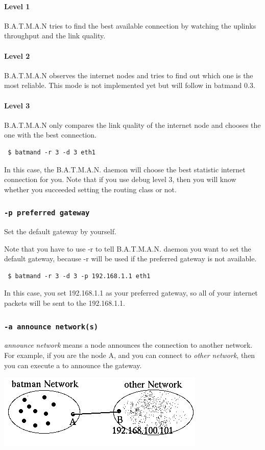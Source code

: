 \documentclass[
	12pt,
	a4paper,
	twoside,
	english,
	headsepline,
	footnosepline,
	automark,
	normalheadings,
	openany,
	cleardoubleplain,
	abstracton,
	idxtotoc,
	liststotoc,
	bibtotoc,
 	BCOR8mm,
]{scrartcl}
\newcommand{\subsubsectionttt}[1]{\subsubsection{\texttt{#1}}}
\begin{document}
\paragraph*{Level 1}
B.A.T.M.A.N tries to find the best available connection by watching the uplinks throughput and the link quality.

\paragraph*{Level 2}
B.A.T.M.A.N observes the internet nodes and tries to find out which one is the most reliable. This mode is not implemented yet but will follow in batmand 0.3.

\paragraph*{Level 3}
B.A.T.M.A.N only compares the link quality of the internet node and chooses the one with the best connection.

\begin{verbatim}
 $ batmand -r 3 -d 3 eth1
\end{verbatim}
In this case, the B.A.T.M.A.N. daemon will choose the best statistic internet connection for you. Note that if you use debug level 3, then you will know whether you succeeded setting the routing class or not.

\subsubsectionttt{-p preferred gateway}
Set the default gateway by yourself.

Note that you have to use -r to tell B.A.T.M.A.N. daemon you want to set the default gateway, because -r will be used if the preferred gateway is not available.

\begin{verbatim}
 $ batmand -r 3 -d 3 -p 192.168.1.1 eth1
\end{verbatim}
In this case, you set 192.168.1.1 as your preferred gateway, so all of your internet packets will be sent to the 192.168.1.1.

\subsubsectionttt{-a announce network(s)}
\emph{announce network} means a node announces the connection to another network. For example, if you are the node A, and you can connect to \emph{other network}, then you can execute a to announce the gateway.

\begin{center}
\includegraphics[scale=0.8]{announce_networks}
\end{center}
\end{document}
